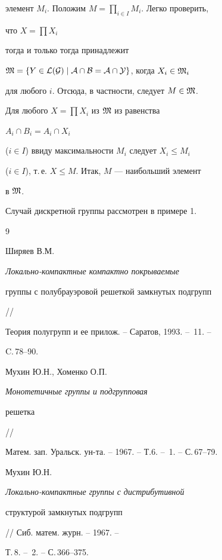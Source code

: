\begin{pf}
элемент $M_i$. Положим $M=\prod\limits_{i\in I}M_i$. Легко проверить, 


что $X=\prod X_i$ 


тогда и только тогда принадлежит


$\frak M=\{Y\in\cal L(G)\mid A\cap B=A\cap Y\}$, когда $X_i\in\frak M_i$ 


для любого $i$. Отсюда, в частности, следует $M\in\frak M$. 


Для любого $X=\prod X_i$ из $\frak M$ из равенства 


$A_i\cap B_i=A_i\cap X_i$ 


($i\in I$) ввиду максимальности $M_i$ следует $X_i\le M_i$ 


($i\in I$), т.\,е. $X\le M$. Итак, $M$ --- наибольший элемент  


в $\frak M$.  


\end{pf}


 


Случай дискретной группы рассмотрен в примере 1. 


 


\begin{thebibliography}{9} 


 




Ширяев В.М. {\em Локально-компактные компактно покрываемые 


группы с полубрауэровой решеткой замкнутых подгрупп} //  


Теория полугрупп и ее прилож. -- Саратов, 1993. -- \No\,11. -- 


C.\,78--90. 




Мухин Ю.Н., Хоменко О.П. {\em Монотетичные группы и подгрупповая 


решетка} //


Матем. зап. Уральск. ун-та. -- 1967. -- Т.6. -- \No\,1. -- С.\,67--79. 




Мухин Ю.Н. {\em Локально-компактные группы с дистрибутивной 


структурой замкнутых подгрупп} // Сиб. матем. журн. -- 1967. -- 


Т.\,8. -- \No\,2. -- С.\,366--375. 


 


\end{thebibliography} 


 


\vskip 2cm 


 






 


\label{end} 


 


 


